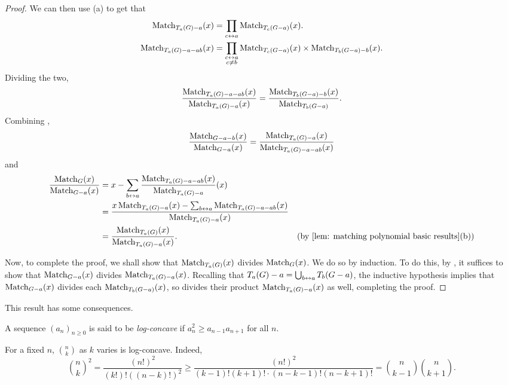 \begin{proof}
		We can then use (a) to get that
		\begin{align*}
			\operatorname{Match}_{T_a(G)-a}(x) &= \prod_{c\leftrightarrow a} \operatorname{Match}_{T_c(G-a)}(x). \\
			\operatorname{Match}_{T_a(G)-a-ab}(x) &= \prod_{\substack{c \leftrightarrow a \\ c \ne b}} \operatorname{Match}_{T_c(G-a)}(x) \times \operatorname{Match}_{T_b(G-a)-b}(x).		
		\end{align*}
		Dividing the two,
		\begin{equation}
			\frac{\operatorname{Match}_{T_a(G)-a-ab}(x)}{\operatorname{Match}_{T_a(G)-a}(x)} = \frac{\operatorname{Match}_{T_b(G-a)-b}(x)}{\operatorname{Match}_{T_b(G-a)}}. \label{eqnmatch3}
		\end{equation}
		Combining ,
		\[ \frac{\operatorname{Match}_{G-a-b}(x)}{\operatorname{Match}_{G-a}(x)} = \frac{\operatorname{Match}_{T_a(G)-a}(x)}{\operatorname{Match}_{T_a(G)-a-ab}(x)} \]
		and
		\begin{align*}
			\frac{\Match_G(x)}{\Match_{G-a}(x)} &= x - \sum_{b\adj a} \frac{\Match_{T_a(G)-a-ab}(x)}{\Match_{T_a(G)-a}}(x) \\
				&= \frac{ x\Match_{T_a(G)-a}(x) - \sum_{b \adj a} \Match_{T_a(G)-a-ab}(x) }{\Match_{T_a(G)-a}(x)} \\
				&= \frac{\Match_{T_a(G)}(x)}{\Match_{T_a(G)-a}(x)}. & \text{(by \Cref{lem: matching polynomial basic results}(b))}
		\end{align*}

		Now, to complete the proof, we shall show that $\operatorname{Match}_{T_a(G)}(x)$ divides $\operatorname{Match}_{G}(x)$. We do so by induction. To do this, by , it suffices to show that $\operatorname{Match}_{G-a}(x)$ divides $\operatorname{Match}_{T_a(G)-a}(x)$. Recalling that $T_a(G)-a = \bigcup_{b \leftrightarrow a} T_b(G-a)$, the inductive hypothesis implies that $\operatorname{Match}_{G-a}(x)$ divides each $\operatorname{Match}_{T_b(G-a)}(x)$, so divides their product $\operatorname{Match}_{T_a(G)-a}(x)$ as well, completing the proof.
	\end{proof}

	
	This result has some consequences.

	\begin{fdef}
		A sequence $(a_n)_{n\ge0}$ is said to be \emph{log-concave} if $a_n^2 \ge a_{n-1} a_{n+1}$ for all $n$.
	\end{fdef}

	\begin{fex}
		For a fixed $n$, $\binom{n}{k}$ as $k$ varies is log-concave. Indeed,
		\[ \binom{n}{k}^2 = \frac{(n!)^2}{(k!)!((n-k)!)^2} \ge \frac{(n!)^2}{(k-1)!(k+1)! \cdot (n-k-1)! (n-k+1)!} = \binom{n}{k-1} \binom{n}{k+1}. \]
	\end{fex}

